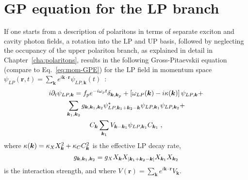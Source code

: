 \section{GP equation for the LP branch}
\label{app:full}
%
If one starts from a description of polaritons in terms of separate
exciton and cavity photon fields, a rotation into the LP and UP basis,
followed by neglecting the occupancy of the upper polariton branch, as
explained in detail in Chapter~\ref{cha:polaritons}, results in the
following Gross-Pitaevskii equation (compare to
Eq.~\eqref{eq:mom-GPE}) for the LP field in momentum space
$\psi_{LP}(\bm{r},t) = \sum_{\bm{k}} e^{i\bm{k}\cdot \bm{r}}
\psi_{LP,\bm{k}} (t)$~\cite{Ciuti_2003}:
%
\begin{multline}
  i\partial_t \psi_{LP,\bm{k}} = f_p e^{-i\omega_p t}
  \delta_{\bm{k},\bm{k}_p} + \left[\omega_{LP} (\kv) - i\kappa
    (\kv)\right]\psi_{LP,\bm{k}} +\\
%
  \sum_{\bm{k}_1, \bm{k}_2} g_{\bm{k}, \bm{k}_1, \bm{k}_2}
  \psi^*_{LP,\bm{k}_1 + \bm{k}_2-\bm{k}} \psi_{LP,\bm{k}_1}
  \psi_{LP,\bm{k}_2} +\\ C_{\kv} \sum_{\bm{k}_1} V_{\bm{k} -
    \bm{k}_1} \psi_{LP,\bm{k}_1} C_{\kv_1}\; ,
\end{multline}
%
where $\kappa(\bm{k})=\kappa_X X^2_{\bm{k}} + \kappa_C C^2_{\bm{k}}$ is the effective LP
decay rate,
%
\begin{equation}
  g_{\bm{k}, \bm{k}_1, \bm{k}_2}=g_X X_{\bm{k}}X_{|\bm{k}_1 + \bm{k}_2-\bm{k}|} X_{\bm{k}_1} X_{\bm{k}_2}
\end{equation}
%
is the interaction strength, and where
$V(\bm{r}) = \sum_{\bm{k}} e^{i\bm{k}\cdot \bm{r}} V_{\bm{k}}$.

